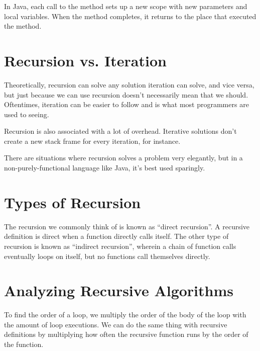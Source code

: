 \documentclass{article}
\begin{document}
In Java, each call to the method sets up a new scope with new parameters and
local variables. When the method completes, it returns to the place that
executed the method.

\section{Recursion vs. Iteration}
Theoretically, recursion can solve any solution iteration can solve, and vice
versa, but just because we can use recursion doesn't necessarily mean that we
should. Oftentimes, iteration can be easier to follow and is what most
programmers are used to seeing.

Recursion is also associated with a lot of overhead. Iterative solutions don't
create a new stack frame for every iteration, for instance.

There are situations where recursion solves a problem very elegantly, but in a
non-purely-functional language like Java, it's best used sparingly.

\section{Types of Recursion}
The recursion we commonly think of is known as ``direct recursion''. A recursive
definition is direct when a function directly calls itself. The other type of
recursion is known as ``indirect recursion'', wherein a chain of function calls
eventually loops on itself, but no functions call themselves directly.

\section{Analyzing Recursive Algorithms}
To find the order of a loop, we multiply the order of the body of the loop with
the amount of loop executions. We can do the same thing with recursive
definitions by multiplying how often the recursive function runs by the order
of the function.
\end{document}

